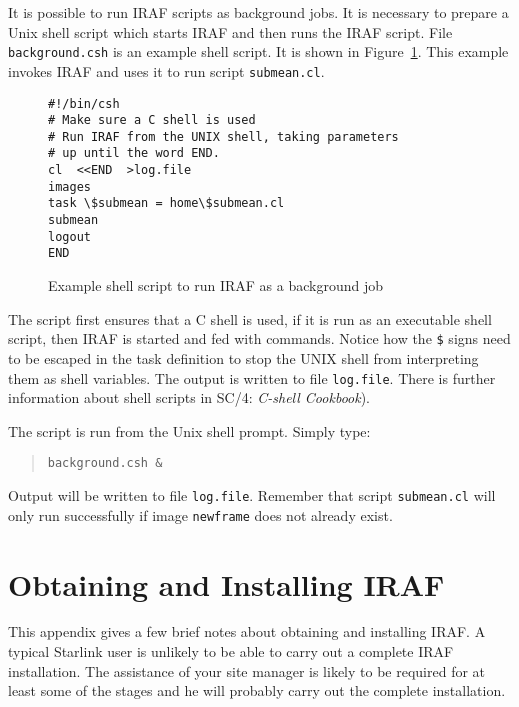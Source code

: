 \documentclass[twoside,11pt]{article}
\newcommand{\xref}[3]{#1}
\newcommand{\xlabel}[1]{}
\begin{document}
It is possible to run IRAF scripts as background jobs.  It is necessary
to prepare a Unix shell script which starts IRAF and then runs the
IRAF script.  File {\tt background.csh} is an example shell script.
It is shown in Figure~\ref{BACKGROUND}.  This example invokes IRAF
and uses it to run script {\tt submean.cl}.

\newpage
\begin{figure}[htbp]

\begin{verbatim}
#!/bin/csh
# Make sure a C shell is used
# Run IRAF from the UNIX shell, taking parameters
# up until the word END.
cl  <<END  >log.file
images
task \$submean = home\$submean.cl
submean
logout
END
\end{verbatim}

\caption{Example shell script to run IRAF as a background job
\label{BACKGROUND} }

\end{figure}

The script first ensures that a C shell is used, if it is run as
an executable shell script, then IRAF is started and fed with
commands. Notice how the {\tt \$} signs need to be escaped in the task
definition to stop the UNIX shell from interpreting them as shell
variables.  The output is written to file {\tt log.file}.  There is
further information about shell scripts in \xref{SC/4: {\it C-shell
Cookbook}}{sc4}{}\/\cite{SC4}).

The script is run from the Unix shell prompt.  Simply type:

\begin{quote}
{\tt background.csh \&}
\end{quote}

Output will be written to file {\tt log.file}.  Remember that script
{\tt submean.cl} will only run successfully if image {\tt newframe}
does not already exist.


\newpage
\appendix
\section{\xlabel{INSTALL}\label{INSTALL}Obtaining and Installing IRAF}

This appendix gives a few brief notes about obtaining and installing
IRAF.  A typical Starlink user is unlikely to be able to carry out a
complete IRAF installation.  The assistance of your site manager is
likely to be required for at least some of the stages and he will
probably carry out the complete installation.
\end{document}
